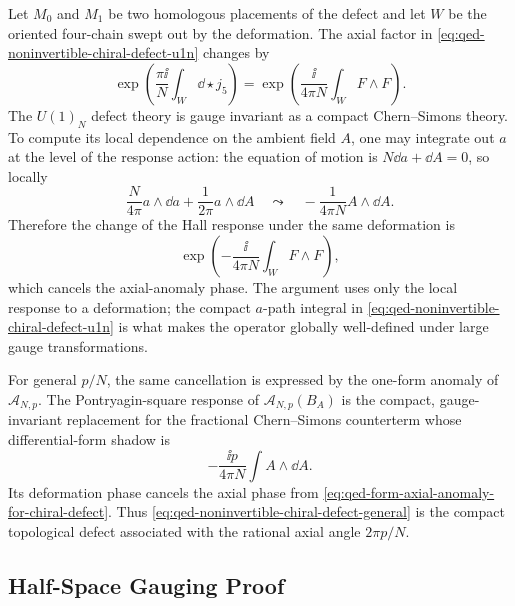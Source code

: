 Let \(M_0\) and \(M_1\) be two homologous placements of the defect and let
\(W\) be the oriented four-chain swept out by the deformation.  The axial
factor in \eqref{eq:qed-noninvertible-chiral-defect-u1n} changes by
  \[
  \exp\left(\frac{\pi\ii}{N}\int_W\dd\star j_5\right)
  =
  \exp\left(\frac{\ii}{4\pi N}\int_W F\wedge F\right).
\]
The \(U(1)_N\) defect theory is gauge invariant as a compact
Chern--Simons theory.  To compute its local dependence on the ambient field
\(A\), one may integrate out \(a\) at the level of the response action:
the equation of motion is \(N\dd a+\dd A=0\), so locally
\[
  \frac{N}{4\pi}a\wedge\dd a+\frac{1}{2\pi}a\wedge\dd A
  \quad\leadsto\quad
  -\frac{1}{4\pi N}A\wedge\dd A .
\]
Therefore the change of the Hall response under the same deformation is
\[
  \exp\left(
  -\frac{\ii}{4\pi N}\int_W F\wedge F
  \right),
\]
which cancels the axial-anomaly phase.  The argument uses only the local
response to a deformation; the compact \(a\)-path integral in
\eqref{eq:qed-noninvertible-chiral-defect-u1n} is what makes the operator
globally well-defined under large gauge transformations.

For general \(p/N\), the same cancellation is expressed by the one-form anomaly
of \(\mathcal A_{N,p}\).  The Pontryagin-square response of
\(\mathcal A_{N,p}(B_A)\) is the compact, gauge-invariant replacement for the
fractional Chern--Simons counterterm whose differential-form shadow is
\[
  -\frac{\ii p}{4\pi N}\int A\wedge\dd A .
\]
Its deformation phase cancels the axial phase from
\eqref{eq:qed-form-axial-anomaly-for-chiral-defect}.  Thus
\eqref{eq:qed-noninvertible-chiral-defect-general} is the compact
topological defect associated with the rational axial angle \(2\pi p/N\).

\subsection{Half-Space Gauging Proof}

